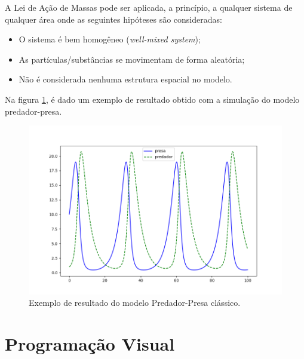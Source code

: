 \documentclass[
	12pt,				%
	openright,			%
	oneside,			%
	a4paper,			%
	main=brazil,
	english,			%
	]{ufsj-abntex2}
\begin{document}
A Lei de Ação de Massas pode ser aplicada, a princípio, a qualquer sistema de qualquer área onde as seguintes hipóteses são consideradas: 
    \begin{itemize}
        \item O sistema é bem homogêneo (\textit{well-mixed system}); 
        \item As partículas/substâncias se movimentam de forma aleatória; 
        \item Não é considerada nenhuma estrutura espacial no modelo.
    \end{itemize}

Na figura \ref{fig:hostprey}, é dado um exemplo de resultado obtido com a simulação do modelo predador-presa. 

\begin{figure}[h]
    \centering
    \includegraphics[scale=0.6]{imgs/hostprey.png} 
    \caption{Exemplo de resultado do modelo Predador-Presa clássico.}
    \label{fig:hostprey}
\end{figure}




\section{Programação Visual}
\label{sec:programacao-visual}
\end{document}
